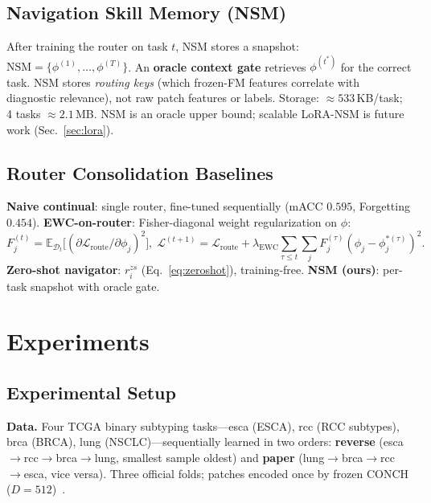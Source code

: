 \documentclass[runningheads]{llncs}
\begin{document}
\subsection{Navigation Skill Memory (NSM)}
\label{sec:nsm}
After training the router on task $t$, NSM stores a snapshot:
$\text{NSM}{=}\{\phi^{(1)},\dots,\phi^{(T)}\}$.
An \textbf{oracle context gate} retrieves $\phi^{(t^*)}$ for the
correct task. NSM stores \emph{routing keys} (which frozen-FM features
correlate with diagnostic relevance), not raw patch features or labels.
Storage: $\approx533$\,KB/task; 4 tasks $\approx2.1$\,MB. NSM is
an oracle upper bound; scalable LoRA-NSM is future work (Sec.~\ref{sec:lora}).

\subsection{Router Consolidation Baselines}
\label{sec:consolidation}
\noindent\textbf{Naive continual}: single router, fine-tuned
sequentially (mACC $0.595$, Forgetting $0.454$).
\noindent\textbf{EWC-on-router}: Fisher-diagonal weight regularization
on $\phi$:
\begin{equation}
F^{(t)}_j{=}\mathbb{E}_{\mathcal{D}_t}\!\bigl[(\partial\mathcal{L}_\text{route}/\partial\phi_j)^2\bigr],\;
\mathcal{L}^{(t+1)}{=}\mathcal{L}_\text{route}
{+}\lambda_\text{EWC}\!\!\sum_{\tau\leq t}\!\sum_j F^{(\tau)}_j(\phi_j{-}\phi^{*(\tau)}_j)^2.
\label{eq:ewc}
\end{equation}
\noindent\textbf{Zero-shot navigator}: $r_i^{zs}$ (Eq.~\ref{eq:zeroshot}),
training-free.
\noindent\textbf{NSM (ours)}: per-task snapshot with oracle gate.

\section{Experiments}
\label{sec:exp}

\subsection{Experimental Setup}
\textbf{Data.} Four TCGA binary subtyping tasks---esca (ESCA), rcc
(RCC subtypes), brca (BRCA), lung (NSCLC)---sequentially learned in
two orders: \textbf{reverse} (esca$\to$rcc$\to$brca$\to$lung,
smallest sample oldest) and \textbf{paper}
(lung$\to$brca$\to$rcc$\to$esca, vice versa). Three official folds;
patches encoded once by frozen CONCH ($D{=}512$)~\cite{lu2024conch}.
\end{document}
